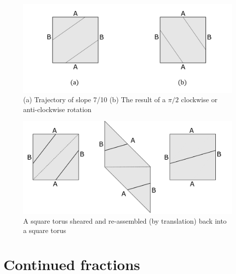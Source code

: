 \documentclass{report}
\begin{document}
\begin{figure} 
\begin{center}
\includegraphics[scale=0.3]{2.6}
\caption{(a) Trajectory of slope 7/10 (b) The result of a $\pi/2$ clockwise or anti-clockwise rotation}
\end{center}
\end{figure}



\begin{figure} 
\begin{center}
\includegraphics[scale=0.3]{2.8}
\caption{A square torus sheared and re-assembled (by translation) back into a square torus}
\end{center}
\end{figure}

\pagebreak

\section{Continued fractions}
\end{document}
